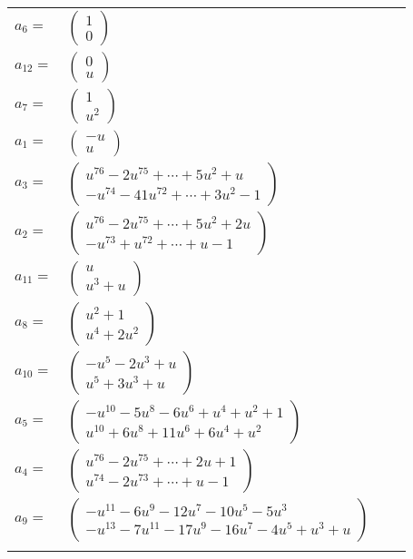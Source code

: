 \documentclass[1p]{elsarticle_modified}
\theoremstyle{definition}
\begin{document}
\begin{tabular}{m{7pt} m{180pt} m{7pt} m{180pt} }
\flushright $a_{6}=$&$\begin{pmatrix}1\\0\end{pmatrix}$ \\
\flushright $a_{12}=$&$\begin{pmatrix}0\\u\end{pmatrix}$ \\
\flushright $a_{7}=$&$\begin{pmatrix}1\\u^2\end{pmatrix}$ \\
\flushright $a_{1}=$&$\begin{pmatrix}- u\\u\end{pmatrix}$ \\
\flushright $a_{3}=$&$\begin{pmatrix}u^{76}-2 u^{75}+\cdots+5 u^2+u\\- u^{74}-41 u^{72}+\cdots+3 u^2-1\end{pmatrix}$ \\
\flushright $a_{2}=$&$\begin{pmatrix}u^{76}-2 u^{75}+\cdots+5 u^2+2 u\\- u^{73}+u^{72}+\cdots+u-1\end{pmatrix}$ \\
\flushright $a_{11}=$&$\begin{pmatrix}u\\u^3+u\end{pmatrix}$ \\
\flushright $a_{8}=$&$\begin{pmatrix}u^2+1\\u^4+2 u^2\end{pmatrix}$ \\
\flushright $a_{10}=$&$\begin{pmatrix}- u^5-2 u^3+u\\u^5+3 u^3+u\end{pmatrix}$ \\
\flushright $a_{5}=$&$\begin{pmatrix}- u^{10}-5 u^8-6 u^6+u^4+u^2+1\\u^{10}+6 u^8+11 u^6+6 u^4+u^2\end{pmatrix}$ \\
\flushright $a_{4}=$&$\begin{pmatrix}u^{76}-2 u^{75}+\cdots+2 u+1\\u^{74}-2 u^{73}+\cdots+u-1\end{pmatrix}$ \\
\flushright $a_{9}=$&$\begin{pmatrix}- u^{11}-6 u^9-12 u^7-10 u^5-5 u^3\\- u^{13}-7 u^{11}-17 u^9-16 u^7-4 u^5+u^3+u\end{pmatrix}$\\&\end{tabular}
\end{document}
